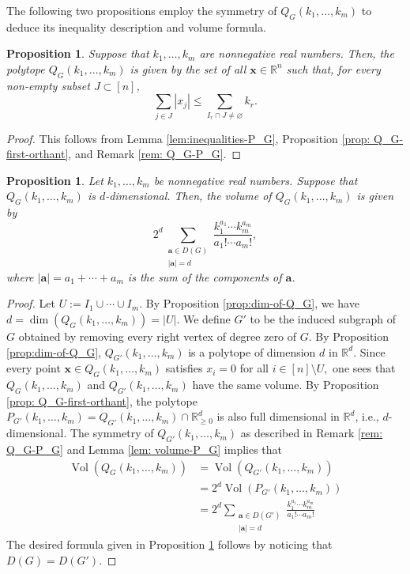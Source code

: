 \documentclass[11pt,a4paper]{article}
\newcommand{\vct}[1]{\boldsymbol{#1}}
\newcommand{\R}{\mathbb{R}}
\newcommand{\Vol}{\operatorname{Vol}}
\newcommand{\1}{\mathbf{1}}
\theoremstyle{plain}
\newtheorem{proposition}[theorem]{Proposition}
\theoremstyle{definition}
\begin{document}
The following two propositions employ the symmetry of $Q_G(k_1, \dots, k_m)$ to deduce its inequality description and volume formula.

\begin{proposition}\label{prop:inequality-Q_G}
Suppose that $k_1,\ldots,k_m$ are nonnegative real numbers. Then, the polytope $Q_G(k_1,\ldots,k_m)$ is given by the set of all $\vct{x}\in\R^n$ such that, for every non-empty subset $J\subset[n]$,
\[
\sum_{j\in J}|x_j|\le \sum_{I_r\cap J\ne\varnothing}k_r.
\]
\end{proposition}
\begin{proof}
This follows from Lemma \ref{lem:inequalities-P_G}, Proposition \ref{prop: Q_G-first-orthant}, and Remark \ref{rem: Q_G-P_G}.
\end{proof}

\begin{proposition}\label{prop:volume-Q_G}
Let $k_1,\ldots,k_m$ be nonnegative real numbers. Suppose that $Q_G(k_1,\ldots,k_m)$ is $d$-dimensional. Then, the volume of $Q_G(k_1,\ldots,k_m)$ is given by
\[
2^d\sum_{\substack{\vct{a}\in D(G)\\|\vct{a}|=d}}
\frac{k_1^{a_1}\cdots k_m^{a_m}}{a_1!\cdots a_m!},
\]
where $|\vct{a}| = a_1+\cdots+a_m$ is the sum of the components of $\vct{a}$.
\end{proposition}
\begin{proof}
Let $U := I_1\cup \cdots \cup I_m.$ By Proposition \ref{prop:dim-of-Q_G}, we have $d = \dim(Q_G(k_1, \dots, k_m)) = |U|$. We define $G'$ to be the induced subgraph of $G$ obtained by removing every right vertex of degree zero of $G$. By Proposition \ref{prop:dim-of-Q_G}, $Q_{G'}(k_1, \dots, k_m)$ is a polytope of dimension $d$ in $\R^{d}$. Since every point $\vct{x} \in Q_G(k_1, \dots, k_m)$ satisfies $x_i = 0$ for all $i \in [n]\setminus U,$ one sees that $Q_G(k_1, \dots, k_m)$ and $Q_{G'}(k_1, \dots, k_m)$ have the same volume. By Proposition \ref{prop: Q_G-first-orthant}, the polytope $P_{G'}(k_1, \dots, k_m) = Q_{G'}(k_1, \dots, k_m)\cap \R^{d}_{\geq 0}$ is also full dimensional in $\R^{d}$, i.e., $d$-dimensional. The symmetry of $Q_{G'}(k_1, \dots, k_m)$ as described in Remark \ref{rem: Q_G-P_G} and Lemma \ref{lem: volume-P_G} implies that
\begin{align*}\label{eq:volume-calculation}
   \Vol(Q_G(k_1, \dots, k_m)) &= \Vol(Q_{G'}(k_1,\dots, k_m))\\ &= 2^d\Vol(P_{G'}(k_1,\dots, k_m))\\
   &= 2^d\sum_{\substack{\vct{a}\in D(G')\\|\vct{a}|=d}}
\frac{k_1^{a_1}\cdots k_m^{a_m}}{a_1!\cdots a_m!}
\end{align*}
The desired formula given in Proposition \ref{prop:volume-Q_G} follows by noticing that $D(G) = D(G').$
\end{proof}
\end{document}
